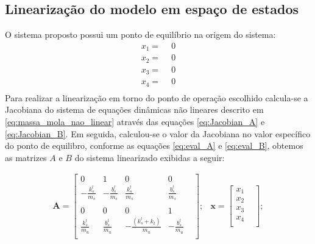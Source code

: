 \documentclass[a4paper]{ifacconf}
\begin{document}
        \subsection{Linearização do modelo em espaço de estados}
        
    O sistema proposto possui um ponto de equilíbrio na origem do sistema:
    \begin{equation*}
        \begin{split}
        x_1=\ \ &0\\
        x_2=\ \ &0\\
        x_3=\ \ &0\\
        x_4=\ \ &0\\
        \end{split}
    \end{equation*}
    Para realizar a linearização em torno do ponto de operação escolhido calcula-se a Jacobiana do sistema de equações dinâmicas não lineares descrito em \ref{eq:massa_mola_nao_linear} através das equações \ref{eq:Jacobian_A} e \ref{eq:Jacobian_B}. Em seguida, calculou-se o valor da Jacobiana no valor específico do ponto de equilibro, conforme as equações \ref{eq:eval_A} e \ref{eq:eval_B}, obtemos as matrizes $A$ e $B$ do sistema linearizado exibidas a seguir:
 
    \begin{equation*} 
    \begin{split}
        \mathbf{A} =
        \begin{bmatrix}
            0 & 1 & 0 & 0 & \\
            -\frac{k_{s}^{l}}{m_s}&-\frac{b_{s}^{l}}{m_s}&\frac{k_{s}^{l}}{m_s}&\frac{b_{s}^{l}}{m_s} &\\ \\
            0 & 0 & 0 & 1 & \\
            \frac{k_{s}^{l}}{m_u}&\frac{b_{s}^{l}}{m_u}&-\frac{(k_{s}^{l}+k_t)}{m_u}&-\frac{b_{s}^{l}}{m_u} &\\
        \end{bmatrix};
    \end{split}
    \begin{split}
       \mathbf{x} = 
        \begin{bmatrix}
             x_1 &\\
             x_2 &\\
             x_3 &\\
             x_4 &\\
        \end{bmatrix}; 
    \end{split}
    \end{equation*}
    
\end{document}
